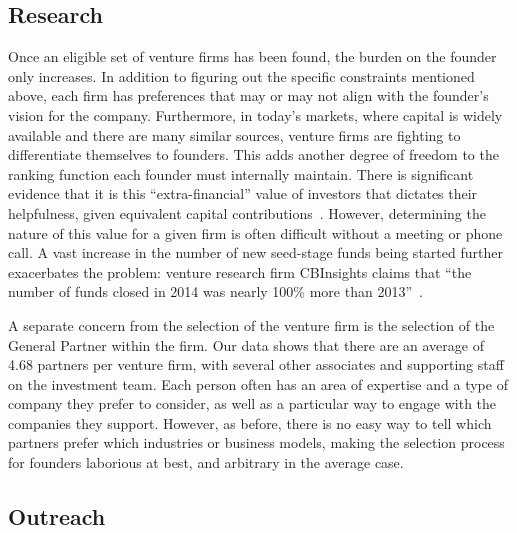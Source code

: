 \subsection{Research}
\label{ch3:motivation:research}

Once an eligible set of venture firms has been found, the burden on the founder only increases. In addition to figuring out the specific constraints mentioned above, each firm has preferences that may or may not align with the founder's vision for the company. Furthermore, in today's markets, where capital is widely available and there are many similar sources, venture firms are fighting to differentiate themselves to founders. This adds another degree of freedom to the ranking function each founder must internally maintain. There is significant evidence that it is this ``extra-financial'' value of investors that dictates their helpfulness, given equivalent capital contributions~\cite{doi:10.1111/j.1540-6261.2004.00680.x}. However, determining the nature of this value for a given firm is often difficult without a meeting or phone call. A vast increase in the number of new seed-stage funds being started further exacerbates the problem: venture research firm CBInsights claims that ``the number of funds closed in 2014 was nearly 100\% more than 2013''~\cite{cbinsights-research-barbell}.

A separate concern from the selection of the venture firm is the selection of the General Partner within the firm. Our data shows that there are an average of 4.68 partners per venture firm, with several other associates and supporting staff on the investment team. Each person often has an area of expertise and a type of company they prefer to consider, as well as a particular way to engage with the companies they support. However, as before, there is no easy way to tell which partners prefer which industries or business models, making the selection process for founders laborious at best, and arbitrary in the average case.

\subsection{Outreach}

